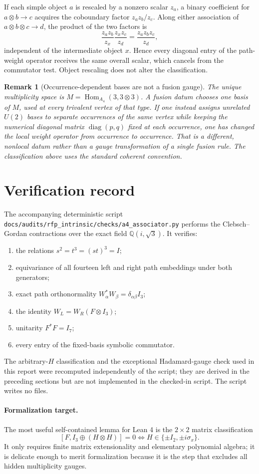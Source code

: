 \documentclass{article}
\newtheorem{remark}[theorem]{Remark}
\newcommand{\Hom}{\operatorname{Hom}}
\newcommand{\diag}{\operatorname{diag}}
\begin{document}
If each simple object $a$ is rescaled by a nonzero scalar $z_a$, a binary
coefficient for $a\otimes b\to c$ acquires the coboundary factor
$z_az_b/z_c$. Along either association of $a\otimes b\otimes c\to d$, the
product of the two factors is
\[
\frac{z_az_b}{z_x}\frac{z_xz_c}{z_d}
 =\frac{z_az_bz_c}{z_d},
\]
independent of the intermediate object $x$. Hence every diagonal entry of
the path-weight operator receives the same overall scalar, which cancels
from the commutator test. Object rescaling does not alter the classification.

\begin{remark}[Occurrence-dependent bases are not a fusion gauge]
The unique multiplicity space is $M=\Hom_{A_4}(3,3\otimes3)$. A fusion datum
chooses one basis of $M$, used at every trivalent vertex of that type. If one
instead assigns unrelated $U(2)$ bases to separate occurrences of the same
vertex while keeping the numerical diagonal matrix $\diag(p,q)$ fixed at
each occurrence, one has changed the local weight operator from occurrence
to occurrence. That is a different, nonlocal datum rather than a gauge
transformation of a single fusion rule. The classification above uses the
standard coherent convention.
\end{remark}

\section{Verification record}

The accompanying deterministic script
\texttt{docs/audits/rfp\_intrinsic/checks/a4\_associator.py} performs the Clebsch--Gordan
contractions over the exact field $\mathbb Q(i,\sqrt3)$. It verifies:
\begin{enumerate}
\item the relations $s^2=t^3=(st)^3=I$;
\item equivariance of all fourteen left and right path embeddings under both
generators;
\item exact path orthonormality $W_\alpha^*W_\beta=\delta_{\alpha\beta}I_3$;
\item the identity $W_L=W_R(F\otimes I_3)$;
\item unitarity $F^*F=I_7$;
\item every entry of the fixed-basis symbolic commutator.
\end{enumerate}
The arbitrary-$H$ classification and the exceptional Hadamard-gauge check
used in this report were recomputed independently of the script;
they are derived in the preceding sections but are not implemented in the
checked-in script. The script writes no files.

\paragraph{Formalization target.}
The most useful self-contained lemma for Lean 4 is the $2\times2$ matrix
classification
\[
[ F,I_3\oplus(H\otimes H)]=0
\Longleftrightarrow
H\in\{\pm I_2,\pm i\sigma_x\}.
\]
It only requires finite matrix extensionality and elementary polynomial
algebra; it is delicate enough to merit formalization because it is the step
that excludes all hidden multiplicity gauges.
\end{document}
